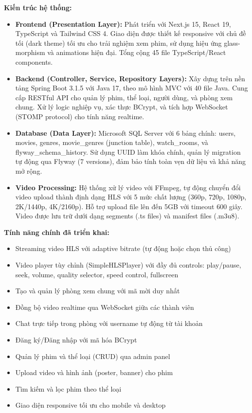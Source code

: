 \textbf{Kiến trúc hệ thống:}
\begin{itemize}
	\item \textbf{Frontend (Presentation Layer):} Phát triển với Next.js 15, React 19, TypeScript và Tailwind CSS 4. Giao diện được thiết kế responsive với chủ đề tối (dark theme) tối ưu cho trải nghiệm xem phim, sử dụng hiệu ứng glass-morphism và animations hiện đại. Tổng cộng 45 file TypeScript/React components.

	\item \textbf{Backend (Controller, Service, Repository Layers):} Xây dựng trên nền tảng Spring Boot 3.1.5 với Java 17, theo mô hình MVC với 40 file Java. Cung cấp RESTful API cho quản lý phim, thể loại, người dùng, và phòng xem chung. Xử lý logic nghiệp vụ, xác thực BCrypt, và tích hợp WebSocket (STOMP protocol) cho tính năng realtime.

	\item \textbf{Database (Data Layer):} Microsoft SQL Server với 6 bảng chính: users, movies, genres, movie\_genres (junction table), watch\_rooms, và flyway\_schema\_history. Sử dụng UUID làm khóa chính, quản lý migration tự động qua Flyway (7 versions), đảm bảo tính toàn vẹn dữ liệu và khả năng mở rộng.

	\item \textbf{Video Processing:} Hệ thống xử lý video với FFmpeg, tự động chuyển đổi video upload thành định dạng HLS với 5 mức chất lượng (360p, 720p, 1080p, 2K/1440p, 4K/2160p). Hỗ trợ upload file lên đến 5GB với timeout 600 giây. Video được lưu trữ dưới dạng segments (.ts files) và manifest files (.m3u8).
\end{itemize}

\textbf{Tính năng chính đã triển khai:}
\begin{itemize}
	\item Streaming video HLS với adaptive bitrate (tự động hoặc chọn thủ công)
	\item Video player tùy chỉnh (SimpleHLSPlayer) với đầy đủ controls: play/pause, seek, volume, quality selector, speed control, fullscreen
	\item Tạo và quản lý phòng xem chung với mã mời duy nhất
	\item Đồng bộ video realtime qua WebSocket giữa các thành viên
	\item Chat trực tiếp trong phòng với username tự động từ tài khoản
	\item Đăng ký/Đăng nhập với mã hóa BCrypt
	\item Quản lý phim và thể loại (CRUD) qua admin panel
	\item Upload video và hình ảnh (poster, banner) cho phim
	\item Tìm kiếm và lọc phim theo thể loại
	\item Giao diện responsive tối ưu cho mobile và desktop
\end{itemize}




